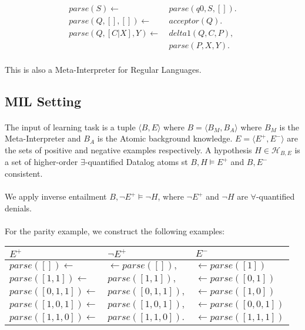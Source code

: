 \documentclass{article}
\theoremstyle{plain}
\theoremstyle{definition}
\begin{document}
\begin{multicols}{2}
\begin{align*}
parse(S) \leftarrow\ &parse(q0, S, []).\\
parse(Q, [], []) \leftarrow\ &acceptor(Q).\\
parse(Q, [C|X], Y) \leftarrow\ &delta1(Q, C, P),\\ &parse(P, X, Y).
\end{align*}

\paragraph{} This is also a Meta-Interpreter for Regular Languages.

\subsection{MIL Setting}

\paragraph{} The input of learning task is a tuple $\langle B, E\rangle$ where $B = \langle B_M, B_A \rangle$ where $B_M$ is the Meta-Interpreter and $B_A$ is the Atomic background knowledge. $E = \langle E^+, E^- \rangle$ are the sets of positive and negative examples respectively. A hypothesis $H \in \mathcal{H}_{B,E}$ is a set of higher-order $\exists$-quantified Datalog atoms st $B, H \models E^+$ and $B, E^-$ consistent.

\paragraph{} We apply inverse entailment $B, \lnot E^+ \models \lnot H$, where $\lnot E^+$ and $\lnot H$ are $\forall$-quantified denials.

\paragraph{} For the parity example, we construct the following examples:

\begin{table}[H]
\centering\footnotesize
\begin{tabular}{ | l | l | l | }

\hline
$E^+$ & $\lnot E^+$ & $E^-$ \\
\hline

$parse([]) \leftarrow$ & $\leftarrow parse([]),$ & $\leftarrow parse([1])$ \\
$parse([1, 1]) \leftarrow$ & $parse([1, 1]),$ & $\leftarrow parse([0, 1])$ \\
$parse([0, 1, 1]) \leftarrow$ & $parse([0, 1, 1]),$ & $\leftarrow parse([1, 0])$ \\
$parse([1, 0, 1]) \leftarrow$ & $parse([1, 0, 1]),$ & $\leftarrow parse([0, 0, 1])$ \\
$parse([1, 1, 0]) \leftarrow$ & $parse([1, 1, 0]).$ & $\leftarrow parse([1, 1, 1])$ \\


\end{tabular}
\end{table}
\end{multicols}
\end{document}
